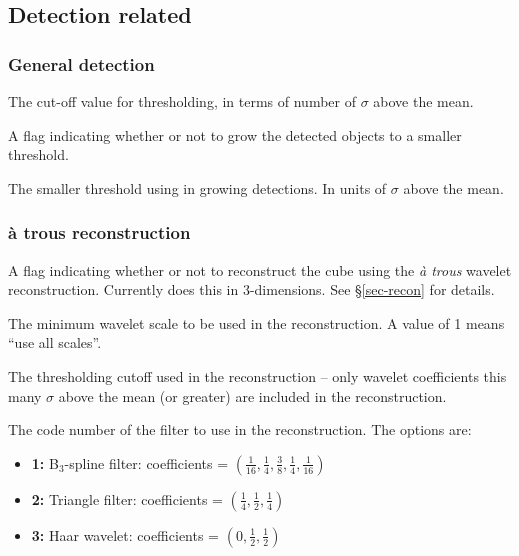 \documentclass[12pt,a4paper]{article}
\newcommand{\entrylabel}[1]{\mbox{\textsf{\bf{#1:}}}\hfil}
\newenvironment{entry}
        {\begin{list}{}%
                {\renewcommand{\makelabel}{\entrylabel}%
                        \setlength{\labelwidth}{30mm}%
                        \setlength{\labelsep}{5pt}%
                        \setlength{\itemsep}{2pt}%
                        \setlength{\parsep}{2pt}%
                        \setlength{\leftmargin}{35mm}%
                }%
        }%
{\end{list}}
\begin{document}
\subsection*{Detection related}

\subsubsection*{General detection}
\begin{entry}
\item[snrCut {\tt [3.]}] The cut-off value for thresholding, in terms
  of number of $\sigma$ above the mean.
\item[flagGrowth {\tt [true]}] A flag indicating whether or not to
  grow the detected objects to a smaller threshold.
\item[growthCut {\tt [1.5]}] The smaller threshold using in growing
  detections. In units of $\sigma$ above the mean.
\end{entry}

\subsubsection*{{\` a} trous reconstruction}
\begin{entry}
\item [flagATrous {\tt [true]}] A flag indicating whether or not to
  reconstruct the cube using the {\it {\`a} trous} wavelet
  reconstruction. Currently does this in 3-dimensions. See
  \S\ref{sec-recon} for details.
\item[scaleMin {\tt [1]}] The minimum wavelet scale to be used in the
  reconstruction. A value of 1 means ``use all scales''.
\item[snrRecon {\tt [4]}] The thresholding cutoff used in the
  reconstruction -- only wavelet coefficients this many $\sigma$ above
  the mean (or greater) are included in the reconstruction. 
\item[filterCode {\tt [2]}] The code number of the filter to use in
  the reconstruction. The options are:
  \begin{itemize}
  \item {\bf 1:} B$_3$-spline filter: coefficients = 
    $(\frac{1}{16}, \frac{1}{4}, \frac{3}{8}, \frac{1}{4}, \frac{1}{16})$
  \item {\bf 2:} Triangle filter: coefficients = $(\frac{1}{4}, \frac{1}{2}, \frac{1}{4})$
  \item {\bf 3:} Haar wavelet: coefficients = $(0, \frac{1}{2}, \frac{1}{2})$
  \end{itemize}
\end{entry}
\end{document}
